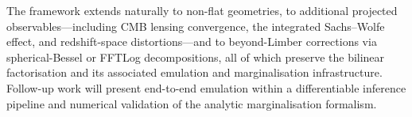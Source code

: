 The framework extends naturally to non-flat geometries, to additional projected observables---including CMB lensing convergence, the integrated Sachs--Wolfe effect, and redshift-space distortions---and to beyond-Limber corrections via spherical-Bessel or FFTLog decompositions, all of which preserve the bilinear factorisation and its associated emulation and marginalisation infrastructure. Follow-up work will present end-to-end emulation within a differentiable inference pipeline and numerical validation of the analytic marginalisation formalism.
